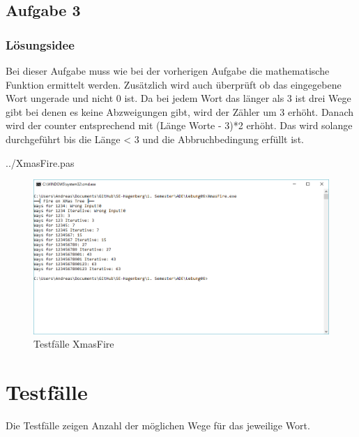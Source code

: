 \subsection*{Aufgabe 3}
\subsubsection*{Lösungsidee}
Bei dieser Aufgabe muss wie bei der vorherigen Aufgabe die mathematische Funktion ermittelt werden. Zusätzlich wird auch überprüft ob das eingegebene Wort ungerade und nicht 0 ist. Da bei jedem Wort das länger als 3 ist drei Wege gibt bei denen es keine Abzweigungen gibt, wird der Zähler um 3 erhöht. Danach wird der counter entsprechend mit (Länge Worte - 3)*2 erhöht. Das wird solange durchgeführt bis die Länge < 3 und die Abbruchbedingung erfüllt ist.
\newline

 {../XmasFire.pas}
\begin{figure}[H]
	\centering
	\includegraphics[scale=0.65]{./pictures/XmasFire.png}
	\caption{Testfälle XmasFire}
	\label{fig: XmasFire}
\end{figure}

\section*{Testfälle}
Die Testfälle zeigen Anzahl der möglichen Wege für das jeweilige Wort.
\newpage



